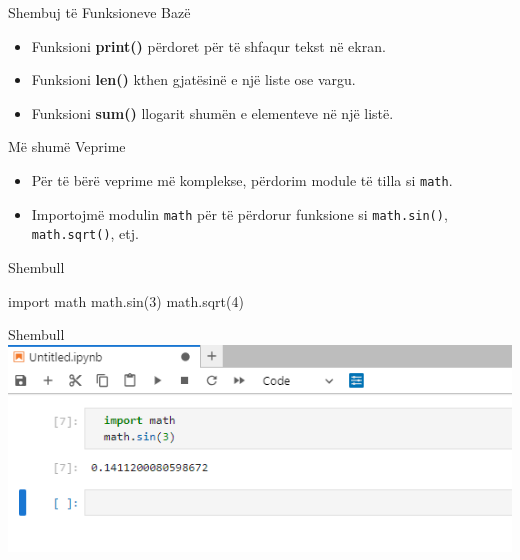 \documentclass[
  ignorenonframetext,
]{beamer}
\newenvironment{Shaded}{\begin{snugshade}}{\end{snugshade}}
\newcommand{\DecValTok}[1]{\textcolor[rgb]{0.00,0.00,0.81}{#1}}
\newcommand{\ImportTok}[1]{#1}
\newcommand{\NormalTok}[1]{#1}
\begin{document}
\begin{frame}{Shembuj të Funksioneve Bazë}
\protect\hypertarget{shembuj-tuxeb-funksioneve-bazuxeb}{}
\begin{itemize}
\item
  Funksioni \textbf{print()} përdoret për të shfaqur tekst në ekran.
\item
  Funksioni \textbf{len()} kthen gjatësinë e një liste ose vargu.
\item
  Funksioni \textbf{sum()} llogarit shumën e elementeve në një listë.
\end{itemize}
\end{frame}

\begin{frame}[fragile]{Më shumë Veprime}
\protect\hypertarget{muxeb-shumuxeb-veprime-1}{}
\begin{itemize}
\item
  Për të bërë veprime më komplekse, përdorim module të tilla si
  \texttt{math}.
\item
  Importojmë modulin \texttt{math} për të përdorur funksione si
  \texttt{math.sin()}, \texttt{math.sqrt()}, etj.
\end{itemize}
\end{frame}

\begin{frame}[fragile]{Shembull}
\protect\hypertarget{shembull}{}
\begin{Shaded}
\begin{Highlighting}[]
  \ImportTok{import}\NormalTok{ math}
\NormalTok{  math.sin(}\DecValTok{3}\NormalTok{)}
\NormalTok{  math.sqrt(}\DecValTok{4}\NormalTok{)}
\end{Highlighting}
\end{Shaded}
\end{frame}

\begin{frame}{Shembull}
\protect\hypertarget{shembull-1}{}
\includegraphics{./Figs/math3.png}
\end{frame}
\end{document}
